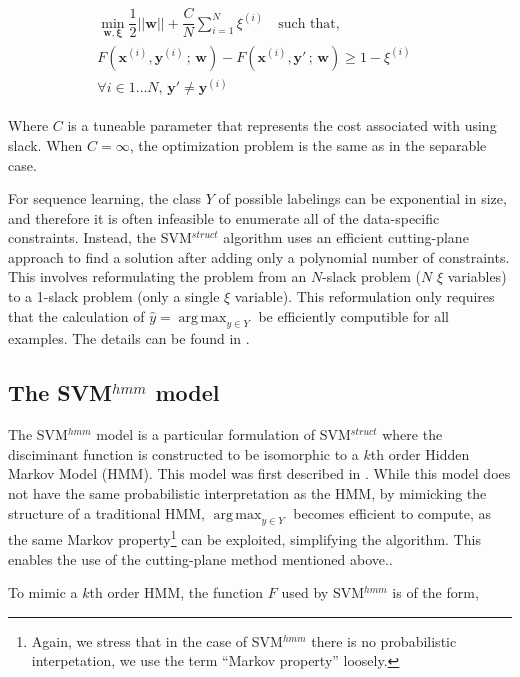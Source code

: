 \documentclass{article}
\DeclareMathOperator*{\argmax}{arg\,max}
\begin{document}
\begin{align*}
\begin{split}
\min_{\mathbf{w, \xi}}\dfrac{1}{2}||\mathbf{w}|| +
\dfrac{C}{N}\sum_{i=1}^{N}\xi^{(i)}
\quad\text{such that,}&\\
F(\mathbf{x}^{(i)}, \mathbf{y}^{(i)}\,;\,\mathbf{w}) -
F(\mathbf{x}^{(i)}, \mathbf{y}'\,;\,\mathbf{w}) \geq 1 - \xi^{(i)} \\
\forall i \in 1\dots N, \,\mathbf{y}' \neq \mathbf{y}^{(i)}
\end{split}
\end{align*}

Where $C$ is a tuneable parameter that represents the cost associated with
using slack. When $C = \infty$, the optimization problem is the same as in
the separable case.

For sequence learning, the class $Y$ of possible labelings can be exponential
in size, and therefore it is often infeasible to enumerate all of the
data-specific constraints. Instead, the SVM$^{struct}$ algorithm uses an
efficient cutting-plane approach to find a solution after adding only a
polynomial number of constraints. This involves reformulating the problem from
an $N$-slack problem ($N$ $\xi$ variables) to a 1-slack problem (only a single
$\xi$ variable). This reformulation only requires that the calculation of
$\hat{y} = \argmax_{y \in Y}$ be efficiently computible for all examples. The
details can be found in \cite{joachims2009cutting}.

\subsection{The SVM$^{hmm}$ model}

The SVM$^{hmm}$ model is a particular formulation of SVM$^{struct}$ where the
disciminant function is constructed to be isomorphic to a $k$th order Hidden
Markov Model (HMM). This model was first described in
\cite{altun2003hidden}. While this model does not have the same
probabilistic interpretation as the HMM, by mimicking the structure of a
traditional HMM, $\argmax_{y \in Y}$ becomes efficient to compute, as the same
Markov property\footnote{Again, we stress that in the case of SVM$^{hmm}$ there
is no probabilistic interpetation, we use the term ``Markov property'' loosely.}
can be exploited, simplifying the algorithm. This enables the use of the
cutting-plane method mentioned above..

To mimic a $k$th order HMM, the function $F$ used by SVM$^{hmm}$ is of the
form,
\end{document}
